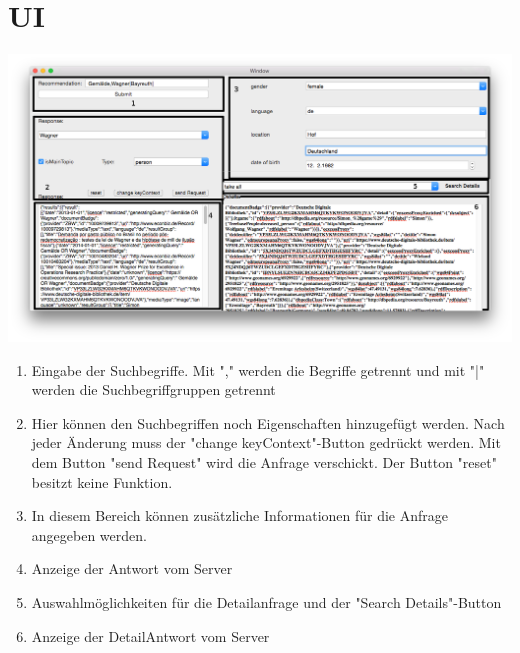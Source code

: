 \documentclass[a4paper,10pt]{article}
\begin{document}
\section{UI}
\includegraphics[scale=0.35]{ContentPrototyp2.png}
\begin{enumerate}
\item Eingabe der Suchbegriffe. Mit "," werden die Begriffe getrennt und mit "|" werden die Suchbegriffgruppen getrennt
\item Hier können den Suchbegriffen noch Eigenschaften hinzugefügt werden. Nach jeder Änderung muss der "change keyContext"-Button gedrückt werden. Mit dem Button "send Request" wird die Anfrage verschickt. Der Button "reset" besitzt keine Funktion.
\item In diesem Bereich können zusätzliche Informationen für die Anfrage angegeben werden.
\item Anzeige der Antwort vom Server
\item Auswahlmöglichkeiten für die Detailanfrage und der "Search Details"-Button
\item Anzeige der DetailAntwort vom Server
\end{enumerate}
\end{document}
